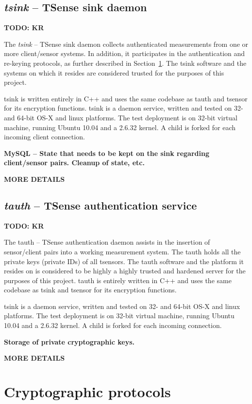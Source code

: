 \subsection{\textit{tsink} -- TSense sink daemon}

\textbf{TODO: KR}

The \textit{tsink} -- TSense sink daemon collects authenticated measurements from one or more client/sensor systems. In addition, it participates in the authentication and re-keying protocols, as further described in Section~\ref{}. The tsink software and the systems on which it resides are considered trusted for the purposes of this project.

tsink is written entirely in C++ and uses the same codebase as tauth and tsensor for its encryption functions.
%
tsink is a daemon service, written and tested on 32- and 64-bit OS-X and linux platforms. The test deployment is on 32-bit virtual machine, running Ubuntu 10.04 and a 2.6.32 kernel. A child is forked for each incoming client connection.

\textbf{MySQL -- State that needs to be kept on the sink regarding client/sensor pairs. Cleanup of state, etc.}

\textbf{MORE DETAILS}

\subsection{\textit{tauth} -- TSense authentication service}

\textbf{TODO: KR}

The tauth -- TSense authentication daemon assists in the insertion of sensor/client pairs into a working measurement system. The tauth holds all the private keys (private IDs) of all tsensors. The tauth software and the platform it resides on is considered to be highly a highly trusted and hardened server for the purposes of this project. tauth is entirely written in C++ and uses the same codebase as tsink and tsensor for its encryption functions.  

tsink is a daemon service, written and tested on 32- and 64-bit OS-X and linux platforms. The test deployment is on 32-bit virtual machine, running Ubuntu 10.04 and a 2.6.32 kernel. A child is forked for each incoming connection.

\textbf{Storage of private cryptographic keys.}

\textbf{MORE DETAILS}

\section{Cryptographic protocols}

